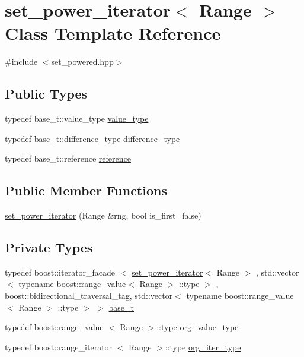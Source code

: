 \hypertarget{classyuh_1_1range__detail_1_1set__power__iterator}{\section{set\-\_\-power\-\_\-iterator$<$ \-Range $>$ \-Class \-Template \-Reference}
\label{db/d16/classyuh_1_1range__detail_1_1set__power__iterator}
}


{\ttfamily \#include $<$set\-\_\-powered.\-hpp$>$}

\subsection*{\-Public \-Types}
\begin{DoxyCompactItemize}
\item 
typedef base\-\_\-t\-::value\-\_\-type \hyperlink{classyuh_1_1range__detail_1_1set__power__iterator_ab7468d4ed49b58c84d6c1b71779fb43e}{value\-\_\-type}
\item 
typedef base\-\_\-t\-::difference\-\_\-type \hyperlink{classyuh_1_1range__detail_1_1set__power__iterator_a9ac6039762e1b262cecb98589ffc1d75}{difference\-\_\-type}
\item 
typedef base\-\_\-t\-::reference \hyperlink{classyuh_1_1range__detail_1_1set__power__iterator_aa5d67140d1557795cc6c30a2849d4e05}{reference}
\end{DoxyCompactItemize}
\subsection*{\-Public \-Member \-Functions}
\begin{DoxyCompactItemize}
\item 
\hyperlink{classyuh_1_1range__detail_1_1set__power__iterator_ae6b3cd64e33a1344b83ad8277222cac8}{set\-\_\-power\-\_\-iterator} (\-Range \&rng, bool is\-\_\-first=false)
\end{DoxyCompactItemize}
\subsection*{\-Private \-Types}
\begin{DoxyCompactItemize}
\item 
typedef boost\-::iterator\-\_\-facade\*
$<$ \hyperlink{classyuh_1_1range__detail_1_1set__power__iterator}{set\-\_\-power\-\_\-iterator}$<$ \-Range $>$\*
, std\-::vector$<$ typename \*
boost\-::range\-\_\-value$<$ \-Range $>$\*
\-::type $>$\*
, boost\-::bidirectional\-\_\-traversal\-\_\-tag, \*
std\-::vector$<$ typename \*
boost\-::range\-\_\-value$<$ \-Range $>$\*
\-::type $>$ $>$ \hyperlink{classyuh_1_1range__detail_1_1set__power__iterator_a66fa2f0147f406817dd3c1c24a015477}{base\-\_\-t}
\item 
typedef boost\-::range\-\_\-value\*
$<$ \-Range $>$\-::type \hyperlink{classyuh_1_1range__detail_1_1set__power__iterator_a69559cacbf423e64c6efb8e1644ea37e}{org\-\_\-value\-\_\-type}
\item 
typedef boost\-::range\-\_\-iterator\*
$<$ \-Range $>$\-::type \hyperlink{classyuh_1_1range__detail_1_1set__power__iterator_a7d85ad9a5f85d7a869dd7ea9557eee8b}{org\-\_\-iter\-\_\-type}
\end{DoxyCompactItemize}
